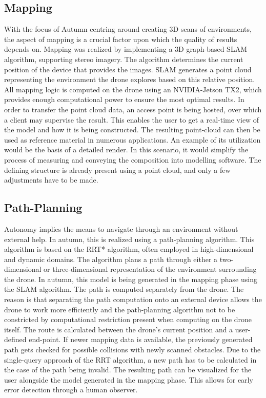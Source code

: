 \subsection{Mapping}
With the focus of Autumn centring around creating 3D scans of environments, the aspect of mapping is a crucial factor upon which the quality of results depends on.\newline
Mapping was realized by implementing a 3D graph-based SLAM algorithm, supporting stereo imagery. The algorithm determines the current position of the device that provides the images. SLAM generates a point cloud representing the environment the drone explores based on this relative position. All mapping logic is computed on the drone using an NVIDIA-Jetson TX2, which provides enough computational power to ensure the most optimal results. In order to transfer the point cloud data, an access point is being hosted, over which a client may supervise the result. This enables the user to get a real-time view of the model and how it is being constructed. The resulting point-cloud can then be used as reference material in numerous applications.\newline
An example of its utilization would be the basis of a detailed render. In this scenario, it would simplify the process of measuring and conveying the composition into modelling software. The defining structure is already present using a point cloud, and only a few adjustments have to be made.

\subsection{Path-Planning}
Autonomy implies the means to navigate through an environment without external help. In autumn, this is realized using a path-planning algorithm. This algorithm is based on the RRT* algorithm, often employed in high-dimensional and dynamic domains. The algorithm plans a path through either a two-dimensional or three-dimensional representation of the environment surrounding the drone. In autumn, this model is being generated in the mapping phase using the SLAM algorithm.\newline
The path is computed separately from the drone. The reason is that separating the path computation onto an external device allows the drone to work more efficiently and the path-planning algorithm not to be constricted by computational restriction present when computing on the drone itself.\newline
The route is calculated between the drone's current position and a user-defined end-point. If newer mapping data is available, the previously generated path gets checked for possible collisions with newly scanned obstacles. Due to the single-query approach of the RRT algorithm, a new path has to be calculated in the case of the path being invalid.
The resulting path can be visualized for the user alongside the model generated in the mapping phase. This allows for early error detection through a human observer.

